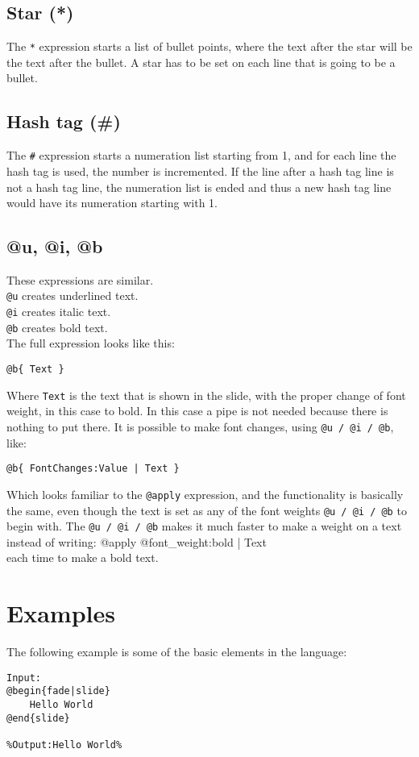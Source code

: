 \subsection{Star (*)}
The \texttt{*} expression starts a list of bullet points, where the text after the star will be the text after the bullet.
A star has to be set on each line that is going to be a bullet.

\subsection{Hash tag (\#)}
The \texttt{\#} expression starts a numeration list starting from 1, and for each line the hash tag is used, the number is incremented. If the line after a hash tag line is not a hash tag line, the numeration list is ended and thus a new hash tag line would have its numeration starting with 1.

\subsection{@u, @i, @b}
These expressions are similar. \\
\texttt{@u} creates underlined text. \\
\texttt{@i} creates italic text. \\
\texttt{@b} creates bold text. \\
The full expression looks like this:
\begin{lstlisting}[frame=single]
@b{ Text }
\end{lstlisting}
Where \texttt{Text} is the text that is shown in the slide, with the proper change of font weight, in this case to bold. In this case a pipe is not needed because there is nothing to put there. 
It is possible to make font changes, using \texttt{@u / @i / @b}, like:
 \begin{lstlisting}[frame=single]
@b{ FontChanges:Value | Text }
\end{lstlisting}

Which looks familiar to the \texttt{@apply} expression, and the functionality is basically the same, even though the text is set as any of the font weights \texttt{@u / @i / @b} to begin with. The \texttt{@u / @i / @b} makes it much faster to make a weight on a text instead of writing: @apply{ @font\_weight:bold | Text } \\
each time to make a bold text.

\section{Examples}
The following example is some of the basic elements in the language:
\begin{lstlisting}[frame=single]
Input:
@begin{fade|slide}
    Hello World
@end{slide}

%Output:Hello World%
\end{lstlisting}

